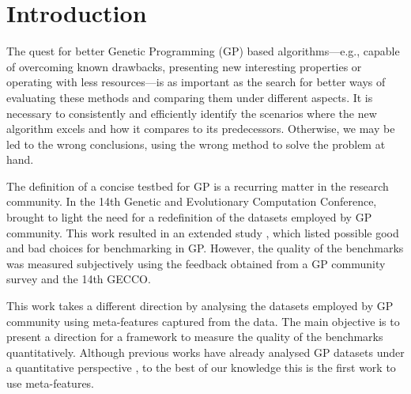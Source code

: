 \section{Introduction}

The quest for better Genetic Programming (GP) based algorithms---e.g., capable of overcoming known drawbacks, presenting new interesting properties or operating with less resources---is as important as the search for better ways of evaluating these methods and comparing them under different aspects. It is necessary to consistently and efficiently identify the scenarios where the new algorithm excels and how it compares to its predecessors. Otherwise, we may be led to the wrong conclusions, using the wrong method to solve the problem at hand.

The definition of a concise testbed for GP is a recurring matter in the research community. In the 14th Genetic and Evolutionary Computation Conference, \citet{mcdermott2012genetic} brought to light the need for a redefinition of the datasets employed by GP community. This work resulted in an extended study \cite{white2013better}, which listed possible good and bad choices for benchmarking in GP. However, the quality of the benchmarks was measured subjectively using the feedback obtained from a GP community survey and the 14th GECCO.

This work takes a different direction by analysing the datasets employed by GP community using meta-features captured from the data. The main objective is to present a direction for a framework to measure the quality of the benchmarks quantitatively. Although previous works have already analysed GP datasets under a quantitative perspective \cite{nicolau2015guidelines,dick2015reexamination}, to the best of our knowledge this is the first work to use meta-features.







